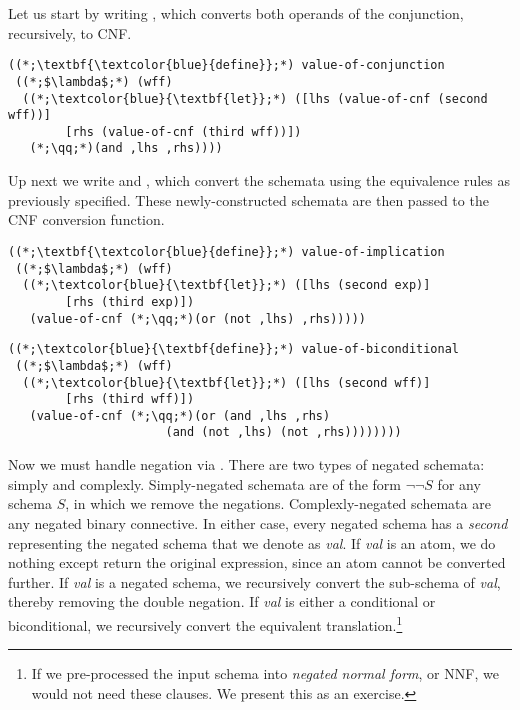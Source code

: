 Let us start by writing , which converts both operands of the conjunction, recursively, to CNF.

\begin{cl}[]{}
\begin{lstlisting}[language=MySOutput]
((*;\textbf{\textcolor{blue}{define}};*) value-of-conjunction
 ((*;$\lambda$;*) (wff)
  ((*;\textcolor{blue}{\textbf{let}};*) ([lhs (value-of-cnf (second wff))]
        [rhs (value-of-cnf (third wff))])
   (*;\qq;*)(and ,lhs ,rhs))))
\end{lstlisting}
\end{cl}

Up next we write  and , which convert the schemata using the equivalence rules as previously specified. These newly-constructed schemata are then passed to the CNF conversion function.

\begin{cl}[]{}
\begin{lstlisting}[language=MySOutput]
((*;\textbf{\textcolor{blue}{define}};*) value-of-implication
 ((*;$\lambda$;*) (wff)
  ((*;\textcolor{blue}{\textbf{let}};*) ([lhs (second exp)]
        [rhs (third exp)])
   (value-of-cnf (*;\qq;*)(or (not ,lhs) ,rhs)))))
\end{lstlisting}
\end{cl}

\begin{cl}[]{}
\begin{lstlisting}[language=MySOutput]
((*;\textcolor{blue}{\textbf{define}};*) value-of-biconditional
 ((*;$\lambda$;*) (wff)
  ((*;\textcolor{blue}{\textbf{let}};*) ([lhs (second wff)] 
        [rhs (third wff)])
   (value-of-cnf (*;\qq;*)(or (and ,lhs ,rhs)
                      (and (not ,lhs) (not ,rhs))))))))
\end{lstlisting}
\end{cl}

Now we must handle negation via . There are two types of negated schemata: simply and complexly. Simply-negated schemata are of the form $\lnot\lnot{}S$ for any schema $S$, in which we remove the negations. Complexly-negated schemata are any negated binary connective. In either case, every negated schema has a \textit{second} representing the negated schema that we denote as \textit{val}. If \textit{val} is an atom, we do nothing except return the original expression, since an atom cannot be converted further. If \textit{val} is a negated schema, we recursively convert the sub-schema of \textit{val}, thereby removing the double negation. If \textit{val} is either a conditional or biconditional, we recursively convert the equivalent translation.\footnote{If we pre-processed the input schema into \textit{negated normal form}, or NNF, we would not need these clauses. We present this as an exercise.}

